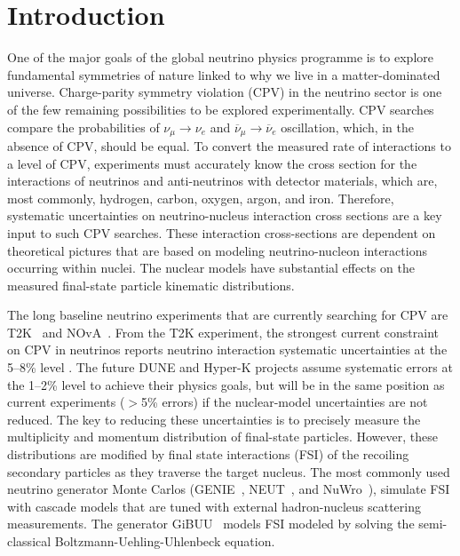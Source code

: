 \section{Introduction}
One of the major goals of the global neutrino physics programme is to explore fundamental symmetries of nature linked to why we live in a matter-dominated universe. 
Charge-parity symmetry violation (CPV) in the neutrino sector is one of the few remaining possibilities to be explored experimentally. 
CPV searches compare the probabilities of $\nu_{\mu}\!\rightarrow\!\nu_e$ and $\overline{\nu}_{\mu}\!\rightarrow\!\overline{\nu}_e$ oscillation, which, in the absence of CPV, should be equal. 
To convert the measured rate of interactions to a level of CPV, experiments must accurately know the cross section for the interactions of neutrinos and anti-neutrinos with detector materials, which are, most commonly, hydrogen, carbon, oxygen, argon, and iron. 
Therefore, systematic uncertainties on neutrino-nucleus interaction cross sections are a key input to such CPV searches.  
These interaction cross-sections are dependent on theoretical pictures that are based on modeling neutrino-nucleon interactions occurring within nuclei. 
The nuclear models have substantial effects on the measured final-state particle kinematic distributions\cite{Mosel:2016cwa}.

The long baseline neutrino experiments that are currently searching for CPV are T2K~\cite{Abe:2019vii} and NOvA~\cite{Acero:2019ksn}.
From the T2K experiment, the strongest current constraint on CPV in neutrinos reports neutrino interaction systematic uncertainties at the 5--8\% level \cite{Abe:2019vii}.
The future DUNE and Hyper-K projects assume systematic errors at the 1--2\% level to achieve their physics goals, but will be in the same position as current experiments ($>$5\% errors) if the nuclear-model uncertainties are not reduced.  
The key to reducing these uncertainties is to precisely measure the multiplicity and momentum distribution of final-state particles. 
However, these distributions are modified by final state interactions (FSI) of the recoiling secondary particles as they traverse the target nucleus. 
The most commonly used neutrino generator Monte Carlos (GENIE~\cite{Andreopoulos:2009rq}, NEUT~\cite{Hayato:2009zz}, and NuWro~\cite{GOLAN2012499}), simulate FSI with cascade models that are tuned with external hadron-nucleus scattering measurements. The generator GiBUU~\cite{lalakulich2013neutrino} models FSI modeled by solving the semi-classical Boltzmann-Uehling-Uhlenbeck equation.


